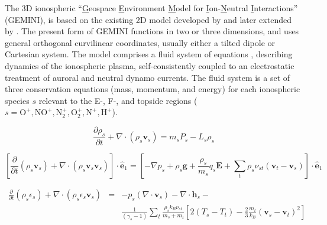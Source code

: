 \documentclass[11pt,letterpaper]{article}
\begin{document}
The 3D ionospheric ``\underline{G}eospace \underline{E}nvironment \underline{M}odel for \underline{I}on-\underline{N}eutral \underline{I}nteractions'' (GEMINI), is based on the existing 2D model developed by \citet{Zettergren:2012} and later extended by \citet{Zettergren:2013,Zettergren:2014,Zettergren:2015b}.  The present form of GEMINI functions in two or three dimensions, and uses general orthogonal curvilinear coordinates, usually either a tilted dipole \citep{Huba:2000} or Cartesian system. The model comprises a fluid system of equations \citep{Schunk:1977,Blelly:1993}, describing dynamics of the ionospheric plasma, self-consistently coupled to an electrostatic treatment of auroral and neutral dynamo currents. The fluid system is a set of three conservation equations (mass, momentum, and energy) for each ionospheric species $s$ relevant to the E-, F-, and topside regions ($s=\mathrm{O^+,NO^+,N_2^+,O_2^+,N^+,H^+}$). 
\begin{linenomath*} \begin{equation}
\frac{\partial \rho_s}{\partial t} + \nabla \cdot \left( \rho_s \mathbf{v}_s \right) = m_s P_s - L_s \rho_s \label{continuity}
\end{equation} \end{linenomath*}
\begin{linenomath*} \begin{equation}
\left[ \frac{\partial }{\partial t} \left( \rho_s \mathbf{v}_s \right) + \nabla \cdot \left( \rho_s \mathbf{v}_s \mathbf{v}_s \right) \right] \cdot \hat{\mathbf{e}}_1 = \left[ -\nabla p_s + \rho_s \mathbf{g} + \frac{\rho_s} {m_s} q_s \mathbf{E} + \sum_t \rho_s \nu_{st} \left(\mathbf{v}_t - \mathbf{v}_s \right) \right] \cdot \hat{\mathbf{e}}_1 \label{momentum}
\end{equation} \end{linenomath*}
\begin{linenomath*} \begin{eqnarray}
\frac{\partial}{\partial t} \left( \rho_s \epsilon_s \right) + \nabla \cdot \left( \rho_s \epsilon_s \mathbf{v}_s \right) &=& - p_s (\nabla \cdot \mathbf{v}_s) - \nabla \cdot \mathbf{h}_s - \\
\nonumber&& \frac{1}{(\gamma_s - 1 )}\sum_t \frac{\rho_s k_B \nu_{st}}{m_s + m_t}\left[ 2 (T_s-T_t) - \frac{2}{3} \frac{m_t}{k_B}(\mathbf{v}_s-\mathbf{v}_t)^2 \right] \label{energy}
\end{eqnarray} \end{linenomath*}
\end{document}
